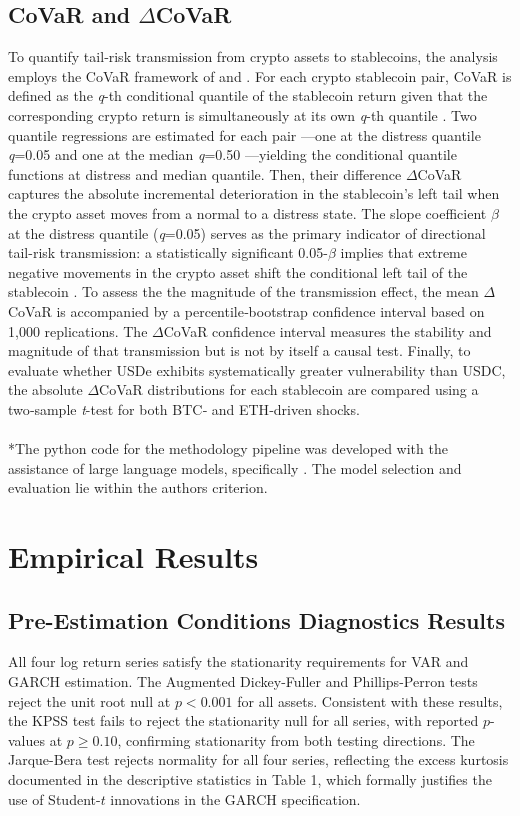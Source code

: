 \documentclass[12pt,a4paper,titlepage,oneside,english]{article}
\begin{document}
\subsection{CoVaR and $\Delta$CoVaR}
To quantify tail‑risk transmission from crypto assets to stablecoins, the analysis employs the CoVaR framework of \parencite{DOI:10.1257/aer.20120555} and \parencite{Chen03032026}. For each crypto stablecoin pair, CoVaR is defined as the \textit{q}-th conditional quantile of the stablecoin return given that the corresponding crypto return is simultaneously at its own \textit{q}-th quantile \parencite{Chen03032026}. Two quantile regressions are estimated for each pair —one at the distress quantile \textit{q}=0.05 and one at the median \textit{q}=0.50 —yielding the conditional quantile functions at distress and median quantile. Then, their difference $\Delta$CoVaR captures the absolute incremental deterioration in the stablecoin's left tail when the crypto asset moves from a normal to a distress state. The slope coefficient $\beta$ at the distress quantile (\textit{q}=0.05) serves as the primary indicator of directional tail-risk transmission: a statistically significant 0.05-$\beta$ implies that extreme negative movements in the crypto asset shift the conditional left tail of the stablecoin \parencite{Chen03032026}. To assess the the magnitude of the transmission effect, the mean $\Delta$CoVaR is accompanied by a percentile‑bootstrap confidence interval based on 1,000 replications. The $\Delta$CoVaR confidence interval measures the stability and magnitude of that transmission but is not by itself a causal test. Finally, to evaluate whether USDe exhibits systematically greater vulnerability than USDC, the absolute $\Delta$CoVaR distributions for each stablecoin are compared using a two‑sample \textit{t}-test for both BTC‑ and ETH‑driven shocks.\\
\\
*The python code for the methodology pipeline was developed with the assistance of large language models, specifically \parencite{claude_sonnet_2025}. The model selection and evaluation lie within the authors criterion.

\section{Empirical Results} 

\subsection{Pre-Estimation Conditions Diagnostics Results}
All four log return series satisfy the stationarity requirements for VAR and GARCH
estimation. The Augmented Dickey-Fuller and Phillips-Perron tests reject the unit root
null at $p < 0.001$ for all assets. Consistent with these results, the KPSS test
fails to reject the stationarity null for all series, with reported $p$-values at
$p \geq 0.10$, confirming stationarity from both testing directions.
The Jarque-Bera test rejects normality for all four
series, reflecting the excess kurtosis documented in the descriptive statistics in Table 1, 
which formally justifies the use of Student-$t$ innovations in the GARCH specification.\\
\end{document}

